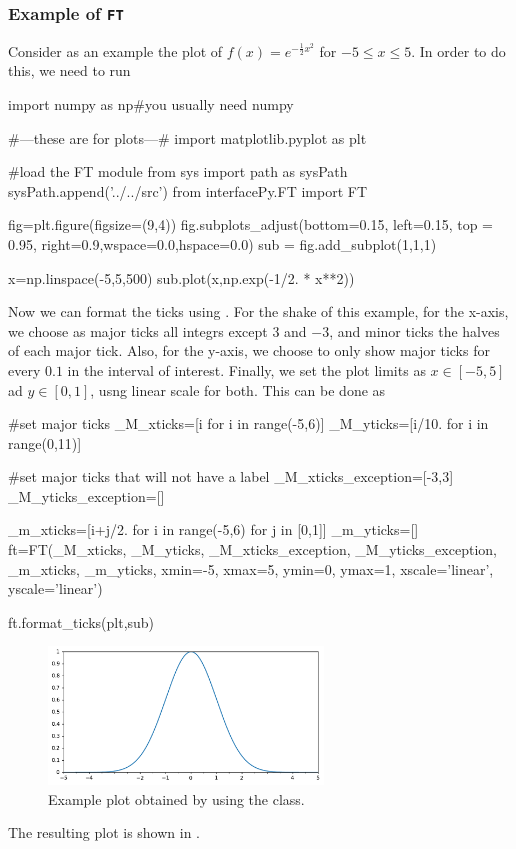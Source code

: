 \documentclass[11pt,a4paper]{article}
\begin{document}
\subsubsection*{Example of {\tt FT}}
%
Consider as an example the plot of $f(x) = e^{-\frac{1}{2}x^2}$ for $-5 \leq x \leq 5$. In order to do this, we need to run 
%
\begin{py}
	import numpy as np#you usually need numpy
	
	#---these are for plots---#
	import matplotlib.pyplot as plt
	
	#load the FT module
	from sys import path as sysPath
	sysPath.append('../../src')
	from interfacePy.FT import FT

	fig=plt.figure(figsize=(9,4))
	fig.subplots_adjust(bottom=0.15, left=0.15, top = 0.95, right=0.9,wspace=0.0,hspace=0.0)
	sub = fig.add_subplot(1,1,1)
	
	x=np.linspace(-5,5,500)
	sub.plot(x,np.exp(-1/2. * x**2))
\end{py}

Now we can format the ticks using . For the shake of this example, for the x-axis, we choose as major ticks all integrs except $3$ and $-3$, and minor ticks the halves of each major tick. Also, for the y-axis, we choose to only show major ticks for every $0.1$ in the interval of interest. Finally, we set the plot limits as $x \in [-5,5]$ ad $y \in [0,1]$, usng linear scale for both. This can be done as

\begin{py}
    #set major ticks
	_M_xticks=[i for i in range(-5,6)]
	_M_yticks=[i/10. for i in range(0,11)]
	
	#set major ticks that will not have a label
	_M_xticks_exception=[-3,3]
	_M_yticks_exception=[]
	
	_m_xticks=[i+j/2. for i in range(-5,6) for j in [0,1]]
	_m_yticks=[]  
	ft=FT(_M_xticks, _M_yticks, _M_xticks_exception, _M_yticks_exception, _m_xticks, _m_yticks,
		xmin=-5, xmax=5, ymin=0, ymax=1, xscale='linear', yscale='linear')
	
	ft.format_ticks(plt,sub)    
\end{py}
%
\begin{figure}[t]
	\centering
		\includegraphics[width=0.65\textwidth]{FT_example.pdf}
		\caption{Example plot obtained by using the  class.}
		\label{fig:FT_example}
\end{figure}
%
The resulting plot is shown in .
\end{document}

